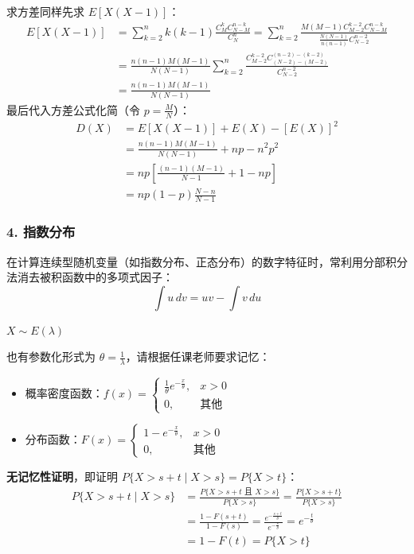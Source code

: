 求方差同样先求 $E[X(X-1)]$：
$$ 
\begin{aligned}
E[X(X-1)] &= \sum_{k=2}^{n} k(k-1) \frac{C_M^k C_{N-M}^{n-k}}{C_N^n} = \sum_{k=2}^{n} \frac{M(M-1) C_{M-2}^{k-2} C_{N-M}^{n-k}}{\frac{N(N-1)}{n(n-1)} C_{N-2}^{n-2}} \\
&= \frac{n(n-1)M(M-1)}{N(N-1)} \sum_{k=2}^{n} \frac{C_{M-2}^{k-2} C_{(N-2)-(M-2)}^{(n-2)-(k-2)}}{C_{N-2}^{n-2}} \\
&= \frac{n(n-1)M(M-1)}{N(N-1)}
\end{aligned}
$$
最后代入方差公式化简（令 $p = \frac{M}{N}$）：
$$ 
\begin{aligned}
D(X) &= E[X(X-1)] + E(X) - [E(X)]^2 \\
&= \frac{n(n-1)M(M-1)}{N(N-1)} + np - n^2 p^2 \\
&= np \left[ \frac{(n-1)(M-1)}{N-1} + 1 - np \right] \\
&= np(1-p)\frac{N-n}{N-1}
\end{aligned}
$$


\vspace{1.5em}

\subsubsection*{4. 指数分布}
\begin{引理Sec11}[分部积分法]
	在计算连续型随机变量（如指数分布、正态分布）的数字特征时，常利用分部积分法消去被积函数中的多项式因子：
	$$ \int u \, dv = uv - \int v \, du $$
\end{引理Sec11}
$X \sim E(\lambda)$

也有参数化形式为 $\theta = \frac{1}{\lambda}$，请根据任课老师要求记忆：
\begin{itemize}
    \item 概率密度函数：$f(x) = \begin{cases} \frac{1}{\theta} e^{-\frac{x}{\theta}}, & x > 0 \\ 0, & \text{其他} \end{cases}$
    \item 分布函数：$F(x) = \begin{cases} 1 - e^{-\frac{x}{\theta}}, & x > 0 \\ 0, & \text{其他} \end{cases}$
\end{itemize}

\textbf{无记忆性证明}\quad ，即证明 $P\{X > s+t \mid X > s\} = P\{X > t\}$：
$$ 
\begin{aligned}
P\{X > s+t \mid X > s\} &= \frac{P\{X > s+t \text{ 且 } X > s\}}{P\{X > s\}} = \frac{P\{X > s+t\}}{P\{X > s\}} \\
&= \frac{1 - F(s+t)}{1 - F(s)} = \frac{e^{-\frac{s+t}{\theta}}}{e^{-\frac{s}{\theta}}} = e^{-\frac{t}{\theta}} \\
&= 1 - F(t) = P\{X > t\}
\end{aligned}
$$

